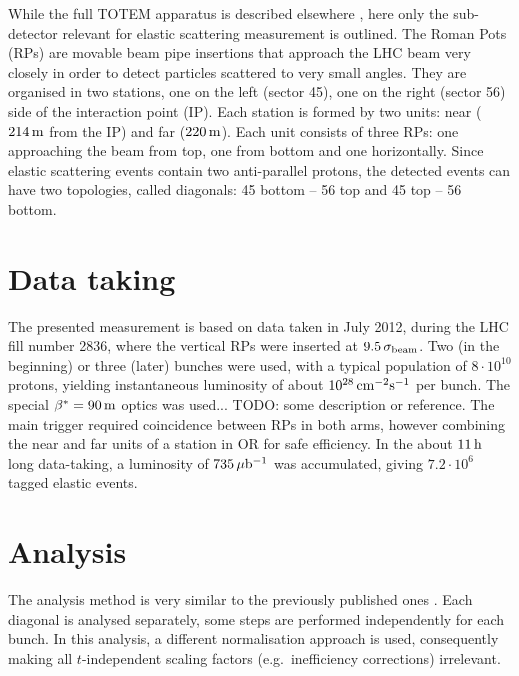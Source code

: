 \documentclass[twocolumn,a4paper,superscriptaddress,preprintnumbers,showpacs,nofootinbib]{revtex4-1}
\def\un#1{\,{\rm #1}}
\begin{document}
While the full TOTEM apparatus is described elsewhere \cite{totem-jinst}, here only the sub-detector
relevant for elastic scattering measurement is outlined. The Roman Pots (RPs) are movable beam pipe
insertions that approach the LHC beam very closely in order to detect particles scattered to very 
small angles. They are organised in two stations, one on the left (sector 45), one on the right
(sector 56) side of the interaction point (IP). Each station is formed by two units: near ($214\un{m}$
from the IP) and far ($220\un{m}$). Each unit consists of three RPs: one approaching the beam from top,
one from bottom and one horizontally. Since elastic scattering events contain two anti-parallel protons,
the detected events can have two topologies, called diagonals: 45 bottom -- 56 top and 45 top -- 56 bottom.


\section{Data taking}

The presented measurement is based on data taken in July 2012, during the LHC fill number 2836, where the vertical
RPs were inserted at $9.5\,\sigma_{\rm beam}$. Two (in the beginning) or three (later) bunches were used, with
a typical population of $8\cdot10^{10}$ protons, yielding instantaneous luminosity of about $10^{28}\un{cm^{-2}s^{-1}}$ per bunch. The special
$\beta^* = 90\un{m}$ optics was used... TODO: some description or reference. The main trigger required coincidence between RPs in both arms,
however combining the near and far units of a station in OR for safe efficiency. In the about $11\un{h}$ long
data-taking, a luminosity of $735\un{\mu b^{-1}}$ was accumulated, giving
$7.2\cdot 10^6$ tagged elastic events.



\section{Analysis}

The analysis method is very similar to the previously published ones \cite{prl111,epl101-el}. Each diagonal is analysed
separately, some steps are performed independently for each bunch. In this analysis, a different normalisation
approach is used, consequently making all $t$-independent scaling factors (e.g.~inefficiency corrections)
irrelevant.
\end{document}
